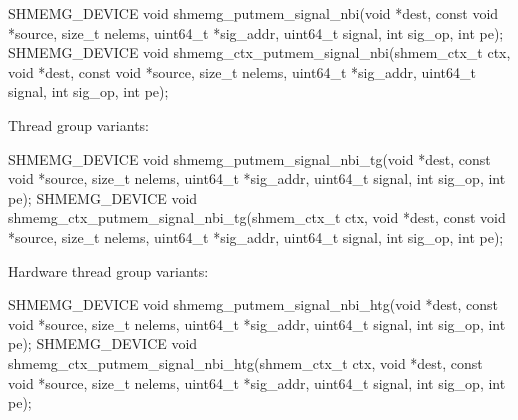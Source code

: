 \begin{apidefinition}
\begin{Csynopsis}
SHMEMG_DEVICE void shmemg_putmem_signal_nbi(void *dest, const void *source,
    size_t nelems, uint64_t *sig_addr, uint64_t signal,
    int sig_op, int pe);
SHMEMG_DEVICE void shmemg_ctx_putmem_signal_nbi(shmem_ctx_t ctx, void *dest,
    const void *source, size_t nelems, uint64_t *sig_addr,
    uint64_t signal, int sig_op, int pe);
\end{Csynopsis}

Thread group variants:
\begin{CsynopsisCol}
SHMEMG_DEVICE void shmemg_putmem_signal_nbi_tg(void *dest, const void *source,
    size_t nelems, uint64_t *sig_addr, uint64_t signal,
    int sig_op, int pe);
SHMEMG_DEVICE void shmemg_ctx_putmem_signal_nbi_tg(shmem_ctx_t ctx,
    void *dest, const void *source, size_t nelems,
    uint64_t *sig_addr, uint64_t signal, int sig_op, int pe);
\end{CsynopsisCol}

Hardware thread group variants:
\begin{CsynopsisCol}
SHMEMG_DEVICE void shmemg_putmem_signal_nbi_htg(void *dest, const void *source,
    size_t nelems, uint64_t *sig_addr, uint64_t signal,
    int sig_op, int pe);
SHMEMG_DEVICE void shmemg_ctx_putmem_signal_nbi_htg(shmem_ctx_t ctx,
    void *dest, const void *source, size_t nelems,
    uint64_t *sig_addr, uint64_t signal, int sig_op, int pe);
\end{CsynopsisCol}

\begin{apiarguments}
\end{apiarguments}


\end{apidefinition}

